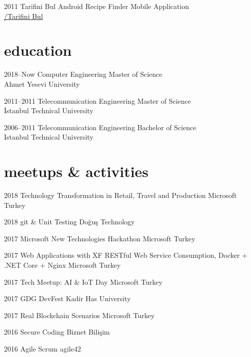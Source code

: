\documentclass[]{../friggeri-cv} %
\begin{document}
\begin{entrylist}

\entry
{2011}
{Tarifini Bul}
{Android}
{Recipe Finder Mobile Application
\\\href{https://play.google.com/store/apps/details?id=com.tarifinibul}{\faAndroid/Tarifini Bul}}

\end{entrylist}

\section{education}

\begin{entrylist}

\entry
{2018--Now}
{Computer Engineering}{}
{Master of Science
\\Ahmet Yesevi University}

\entry
{2011--2011}
{Telecommunication Engineering}{}
{Master of Science
\\İstanbul Technical University}

\entry
{2006--2011}
{Telecommunication Engineering}{}
{Bachelor of Science
\\Istanbul Technical University}
	
\end{entrylist}

\section{meetups \& activities}

\begin{entrylist}

\entry
{2018}
{Technology Transformation in Retail, Travel and Production}{}
{Microsoft Turkey}

\entry
{2018}
{git \& Unit Testing}{}
{Doğuş Technology}

\entry
{2017}
{Microsoft New Technologies Hackathon}{}
{Microsoft Turkey}

\entry
{2017}
{Web Applications with XF RESTful Web Service Consumption, Docker + .NET Core + Nginx}{}
{Microsoft Turkey}

\entry
{2017}
{Tech Meetup: AI \& IoT Day}{}
{Microsoft Turkey}

\entry
{2017}
{GDG DevFest}{}
{Kadir Has University}

\entry
{2017}
{Real Blockchain Scenarios}{}
{Microsoft Turkey}

\entry
{2016}
{Secure Coding}{}
{Biznet Bilişim}

\entry
{2016}
{Agile Scrum}{}
{agile42}

\end{entrylist}
\end{document}
